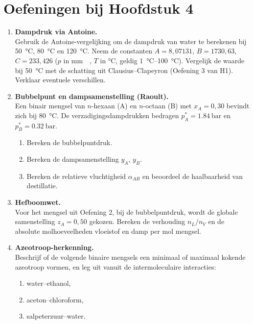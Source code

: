 
\section*{Oefeningen bij Hoofdstuk 4}

\begin{enumerate}

\item \textbf{Dampdruk via Antoine.} \\
Gebruik de Antoine-vergelijking om de dampdruk van water te berekenen bij \SI{50}{\celsius}, \SI{80}{\celsius} en \SI{120}{\celsius}. Neem de constanten $A = 8{,}07131$, $B = 1730{,}63$, $C = 233{,}426$ ($p$ in \si{\milli\metre\of\mercury}, $T$ in \si{\celsius}, geldig \SIrange{1}{100}{\celsius}). Vergelijk de waarde bij \SI{50}{\celsius} met de schatting uit Clausius--Clapeyron (Oefening 3 van H1). Verklaar eventuele verschillen.

\item \textbf{Bubbelpunt en dampsamenstelling (Raoult).} \\
Een binair mengsel van $n$-hexaan (A) en $n$-octaan (B) met $x_A = 0{,}30$ bevindt zich bij \SI{80}{\celsius}. De verzadigingsdampdrukken bedragen $p_A^* = \SI{1.84}{\bar}$ en $p_B^* = \SI{0.32}{\bar}$.
\begin{enumerate}
\item[(a)] Bereken de bubbelpuntdruk.
\item[(b)] Bereken de dampsamenstelling $y_A$, $y_B$.
\item[(c)] Bereken de relatieve vluchtigheid $\alpha_{AB}$ en beoordeel de haalbaarheid van destillatie.
\end{enumerate}

\item \textbf{Hefboomwet.} \\
Voor het mengsel uit Oefening 2, bij de bubbelpuntdruk, wordt de globale samenstelling $z_A = 0{,}50$ gekozen. Bereken de verhouding $n_L/n_V$ en de absolute molhoeveelheden vloeistof en damp per mol mengsel.

\item \textbf{Azeotroop-herkenning.} \\
Beschrijf of de volgende binaire mengsels een minimaal of maximaal kokende azeotroop vormen, en leg uit vanuit de intermoleculaire interacties:
\begin{enumerate}
\item[(a)] water--ethanol,
\item[(b)] aceton--chloroform,
\item[(c)] salpeterzuur--water.
\end{enumerate}


\end{enumerate}
